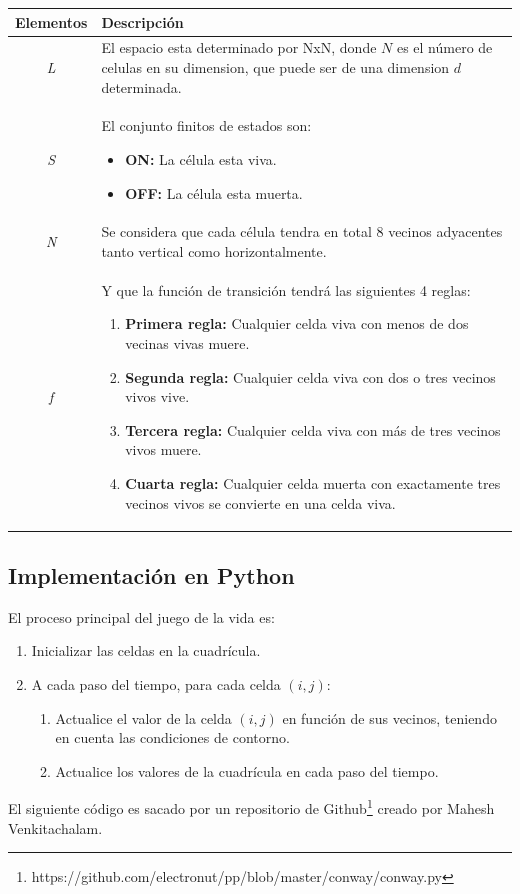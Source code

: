\documentclass[a4paper,12pt]{article}
\newcommand{\eq}[1]{$#1$}
\newcommand{\head}[1]{{\bfseries #1}}
\begin{document}
\begin{table}[h]
    \centering
    \begin{tabular}{cp{9cm}}
        \toprule
        \head{Elementos} & \head{Descripción}\\
        \midrule
        \emph{L} & El espacio esta determinado por NxN, donde \eq{N} es el número de celulas en 
        su dimension, que puede ser de una dimension \eq{d} determinada.\\
        \emph{S} & El conjunto finitos de estados son:
        \begin{itemize}
        \item \head{ON:} La célula esta viva.
        \item \head{OFF:} La célula esta muerta.
        \end{itemize}\\
        \emph{N} & Se considera que cada célula tendra en total 8 vecinos adyacentes tanto vertical como horizontalmente.\\
        \emph{f} & Y que la función de transición tendrá las siguientes 4 reglas:
        \begin{enumerate}
          \item \head{Primera regla:} Cualquier celda viva con menos de dos vecinas vivas muere.
          \item \head{Segunda regla:} Cualquier celda viva con dos o tres vecinos vivos vive.
          \item \head{Tercera regla:} Cualquier celda viva con más de tres vecinos vivos muere.
          \item \head{Cuarta regla: }Cualquier celda muerta con exactamente tres vecinos vivos se convierte en una celda viva.
        \end{enumerate}\\
        \bottomrule            
    \end{tabular}
\end{table}

\subsection{Implementación en Python}
El proceso principal del juego de la vida es\cite{cita3}:
\begin{enumerate}
    \item Inicializar las celdas en la cuadrícula.
    \item A cada paso del tiempo, para cada celda \eq{(i, j)}:
    \begin{enumerate}
        \item Actualice el valor de la celda \eq{(i, j)} en función de sus vecinos, 
        teniendo en cuenta las condiciones de contorno.
        \item Actualice los valores de la cuadrícula en cada paso del tiempo.
    \end{enumerate}
\end{enumerate}
\clearpage
El siguiente código es sacado por un repositorio de Github\footnote{https://github.com/electronut/pp/blob/master/conway/conway.py}
creado por Mahesh Venkitachalam.
\end{document}
